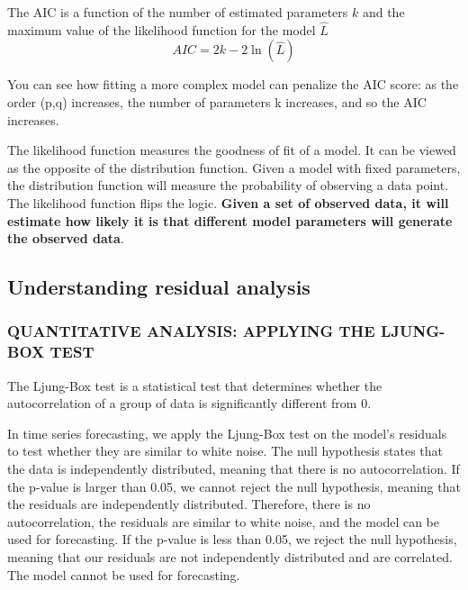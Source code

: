 The AIC is a function of the number of estimated parameters $k$ and the maximum value of the likelihood function for the model $\hat{L}$
\begin{equation}
    AIC = 2k-2\ln(\hat{L})
\end{equation}

You can see how fitting a more complex model can penalize the AIC score: as the order (p,q) increases, the number of parameters k increases, and so the AIC increases.

The likelihood function measures the goodness of fit of a model. It can be viewed as the opposite of the distribution function. Given a model with fixed parameters, the distribution function will measure the probability of observing a data point. The likelihood function flips the logic. \textbf{Given a set of observed data, it will estimate how likely it is that different model parameters will generate the observed data}.

\subsection{Understanding residual analysis}

\subsubsection*{QUANTITATIVE ANALYSIS: APPLYING THE LJUNG-BOX TEST}
The Ljung-Box test is a statistical test that determines whether the autocorrelation of a group of data is significantly different from 0.

In time series forecasting, we apply the Ljung-Box test on the model's residuals to test whether they are similar to white noise. The null hypothesis states that the data is independently distributed, meaning that there is no autocorrelation. If the p-value is larger than 0.05, we cannot reject the null hypothesis, meaning that the residuals are independently distributed. Therefore, there is no autocorrelation, the residuals are similar to white noise, and the model can be used for forecasting. If the p-value is less than 0.05, we reject the null hypothesis, meaning that our residuals are not independently distributed and are correlated. The model cannot be used for forecasting.


